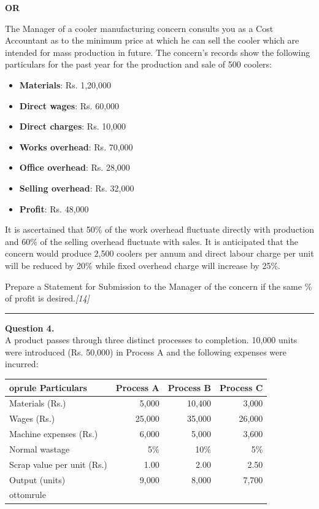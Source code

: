 \documentclass[11pt,a4paper]{article}
\newcommand{\pts}[1]{\hfill   \textit{[#1]}}
\begin{document}
\centerline{   \textbf{OR}}

The Manager of a cooler manufacturing concern consults you as a Cost Accountant as to the minimum price at which he can sell the cooler which are intended for mass production in future. The concern's records show the following particulars for the past year for the production and sale of 500 coolers:

\begin{itemize}
  \item   \textbf{Materials}: Rs. 1,20,000
  \item   \textbf{Direct wages}: Rs. 60,000
  \item   \textbf{Direct charges}: Rs. 10,000
  \item   \textbf{Works overhead}: Rs. 70,000
  \item   \textbf{Office overhead}: Rs. 28,000
  \item   \textbf{Selling overhead}: Rs. 32,000
  \item   \textbf{Profit}: Rs. 48,000
\end{itemize}

It is ascertained that 50\% of the work overhead fluctuate directly with production and 60\% of the selling overhead fluctuate with sales. It is anticipated that the concern would produce 2,500 coolers per annum and direct labour charge per unit will be reduced by 20\% while fixed overhead charge will increase by 25\%.

Prepare a Statement for Submission to the Manager of the concern if the same \% of profit is desired.\pts{14}

\medskip\rule{\linewidth}{0.2pt}




\noindent   \textbf{Question 4.} \\
A product passes through three distinct processes to completion. 10,000 units were introduced (Rs. 50,000) in Process A and the following expenses were incurred:


\begin{center}
  
\begin{tabular}{lrrr}
     oprule
   \textbf{Particulars} &   \textbf{Process A} &   \textbf{Process B} &   \textbf{Process C} \\
    \midrule
    Materials (Rs.) & 5,000 & 10,400 & 3,000 \\
    Wages (Rs.) & 25,000 & 35,000 & 26,000 \\
    Machine expenses (Rs.) & 6,000 & 5,000 & 3,600 \\
    Normal wastage & 5\% & 10\% & 5\% \\
    Scrap value per unit (Rs.) & 1.00 & 2.00 & 2.50 \\
    Output (units) & 9,000 & 8,000 & 7,700 \\
    ottomrule
  \end{tabular}
\end{center}
\end{document}
